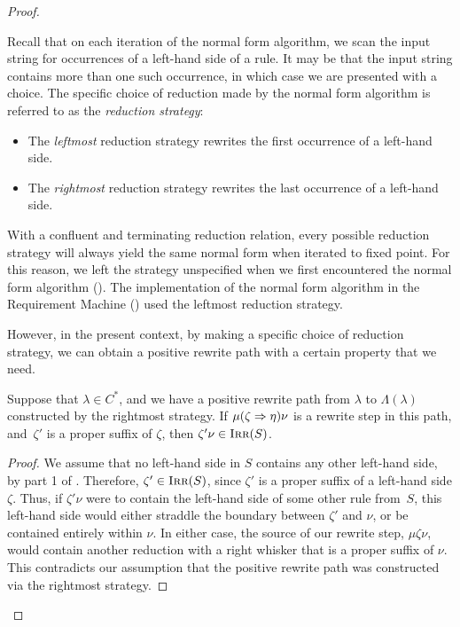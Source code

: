 \documentclass[../generics]{subfiles}
\begin{document}
\begin{proof}
\begin{definition}\label{def:rightmost strategy}
Recall that on each iteration of the normal form algorithm, we scan the input string for occurrences of a left-hand side of a rule. It may be that the input string contains more than one such occurrence, in which case we are presented with a choice. The specific choice of reduction made by the normal form algorithm is referred to as the \emph{reduction strategy}:
\begin{itemize}
\item The \emph{leftmost} reduction strategy rewrites the first occurrence of a left-hand side.
\item The \emph{rightmost} reduction strategy rewrites the last occurrence of a left-hand side.
\end{itemize}
\end{definition}

With a confluent and terminating reduction relation, every possible reduction strategy will always yield the same normal form when iterated to fixed point. For this reason, we left the strategy unspecified when we first encountered the normal form algorithm (). The implementation of the normal form algorithm in the Requirement Machine () used the leftmost reduction strategy.

However, in the present context, by making a specific choice of reduction strategy, we can obtain a positive rewrite path with a certain property that we need.

\begin{lemma}\label{lemma:rightmost}
Suppose that $\lambda \in C^*$, and we have a positive rewrite path from $\lambda$ to $\Lambda(\lambda)$ constructed by the rightmost strategy. If $\mu (\zeta \Rightarrow \eta) \nu$ is a rewrite step in this path, and~$\zeta'$ is a proper suffix of $\zeta$, then $\zeta' \nu \in \textsc{Irr}(S)$.
\end{lemma}
\begin{proof}
We assume that no left-hand side in $S$ contains any other left-hand side, by part 1 of . Therefore, $\zeta' \in \textsc{Irr}(S)$, since $\zeta'$ is a proper suffix of a left-hand side $\zeta$. Thus, if $\zeta' \nu$ were to contain the left-hand side of some other rule from~$S$, this left-hand side would either straddle the boundary between $\zeta'$ and $\nu$, or be contained entirely within $\nu$. In either case, the source of our rewrite step, $\mu \zeta \nu$, would contain another reduction with a right whisker that is a proper suffix of $\nu$. This contradicts our assumption that the positive rewrite path was constructed via the rightmost strategy.
\end{proof}


\end{proof}
\end{document}
